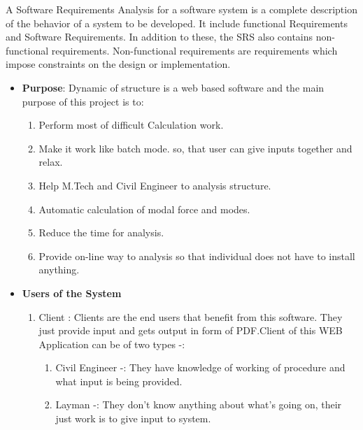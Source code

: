 A Software Requirements Analysis for a software system is a complete 
description of the behavior of a system to be developed. It include functional Requirements
and Software Requirements. In addition to these, the SRS also contains 
non-functional requirements. Non-functional requirements are 
requirements which impose constraints on the design or implementation.
\begin{itemize}
	\item{\bf Purpose}: Dynamic of structure is a web based software and the 
	main purpose of this project is to:
	\begin{enumerate}
		\item Perform most of difficult Calculation work.
		\item Make it work like batch mode. so, that user can give inputs 
		together and relax.
		\item Help M.Tech and Civil Engineer to analysis structure.
		\item Automatic calculation of modal force and modes.
		\item Reduce the time for analysis.
		\item Provide on-line way to analysis so that individual does not have to 
		install anything.
	\end{enumerate}
	
	\item{\bf Users of the System}
	\begin{enumerate} 
		\item Client : Clients are the end users that benefit from this software.
		They just provide input and gets output in form of PDF.Client of this 
		WEB Application can be of two types -:
		\begin{enumerate}
			\item Civil Engineer -: They have knowledge of working of procedure
			and what input is being provided.
			\item Layman -: They don't know anything about what's going on, their just 
			work is to give input to system.   
			
		\end{enumerate}
	\end{enumerate}
\end{itemize}

